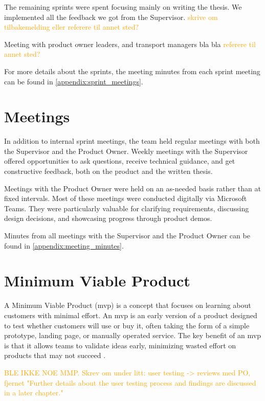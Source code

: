 The remaining sprints were spent focusing mainly on writing the thesis. We implemented all the feedback we got from the Supervisor. \textcolor{orange}{skrive om tilbakemelding eller referere til annet sted?}

Meeting with product owner leaders, and transport managers bla bla \textcolor{orange}{referere til annet sted?}

For more details about the sprints, the meeting minutes from each sprint meeting can be found in \autoref{appendix:sprint_meetings}.

\section{Meetings}

In addition to internal sprint meetings, the team held regular meetings with both the Supervisor and the Product Owner. Weekly meetings with the Supervisor offered opportunities to ask questions, receive technical guidance, and get constructive feedback, both on the product and the written thesis.

Meetings with the Product Owner were held on an as-needed basis rather than at fixed intervals. Most of these meetings were conducted digitally via Microsoft Teams. They were particularly valuable for clarifying requirements, discussing design decisions, and showcasing progress through product demos.

Minutes from all meetings with the Supervisor and the Product Owner can be found in \autoref{appendix:meeting_minutes}.

\section{Minimum Viable Product}

A Minimum Viable Product (\acrshort{mvp}) is a concept that focuses on learning about customers with minimal effort. An \acrshort{mvp} is an early version of a product designed to test whether customers will use or buy it, often taking the form of a simple prototype, landing page, or manually operated service. The key benefit of an \acrshort{mvp} is that it allows teams to validate ideas early, minimizing wasted effort on products that may not succeed \cite{agile_alliance_mvp}. 

\textcolor{orange}{BLE IKKE NOE MMP. Skrev om under litt: user testing -> reviews med PO, fjernet "Further details about the user testing process and findings are discussed in a later chapter."}

